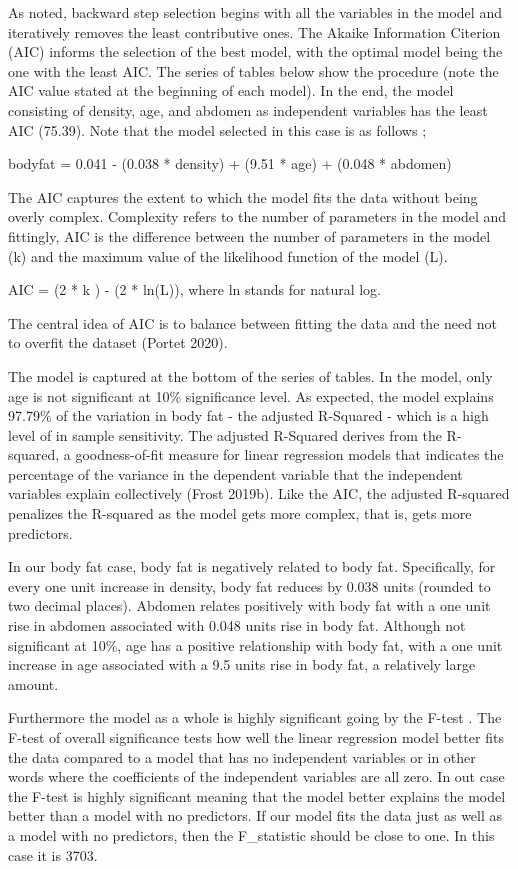 \documentclass[
]{article}
\begin{document}
As noted, backward step selection begins with all the variables in the
model and iteratively removes the least contributive ones. The Akaike
Information Citerion (AIC) informs the selection of the best model, with
the optimal model being the one with the least AIC. The series of tables
below show the procedure (note the AIC value stated at the beginning of
each model). In the end, the model consisting of density, age, and
abdomen as independent variables has the least AIC (75.39). Note that
the model selected in this case is as follows ;

bodyfat = 0.041 - (0.038 * density) + (9.51 * age) + (0.048 * abdomen)

The AIC captures the extent to which the model fits the data without
being overly complex. Complexity refers to the number of parameters in
the model and fittingly, AIC is the difference between the number of
parameters in the model (k) and the maximum value of the likelihood
function of the model (L).

AIC = (2 * k ) - (2 * ln(L)), where ln stands for natural log.

The central idea of AIC is to balance between fitting the data and the
need not to overfit the dataset (Portet 2020).

The model is captured at the bottom of the series of tables. In the
model, only age is not significant at 10\% significance level. As
expected, the model explains 97.79\% of the variation in body fat - the
adjusted R-Squared - which is a high level of in sample sensitivity. The
adjusted R-Squared derives from the R-squared, a goodness-of-fit measure
for linear regression models that indicates the percentage of the
variance in the dependent variable that the independent variables
explain collectively (Frost 2019b). Like the AIC, the adjusted R-squared
penalizes the R-squared as the model gets more complex, that is, gets
more predictors.

In our body fat case, body fat is negatively related to body fat.
Specifically, for every one unit increase in density, body fat reduces
by 0.038 units (rounded to two decimal places). Abdomen relates
positively with body fat with a one unit rise in abdomen associated with
0.048 units rise in body fat. Although not significant at 10\%, age has
a positive relationship with body fat, with a one unit increase in age
associated with a 9.5 units rise in body fat, a relatively large amount.

Furthermore the model as a whole is highly significant going by the
F-test . The F-test of overall significance tests how well the linear
regression model better fits the data compared to a model that has no
independent variables or in other words where the coefficients of the
independent variables are all zero. In out case the F-test is highly
significant meaning that the model better explains the model better than
a model with no predictors. If our model fits the data just as well as a
model with no predictors, then the F\_statistic should be close to one.
In this case it is 3703.
\end{document}
